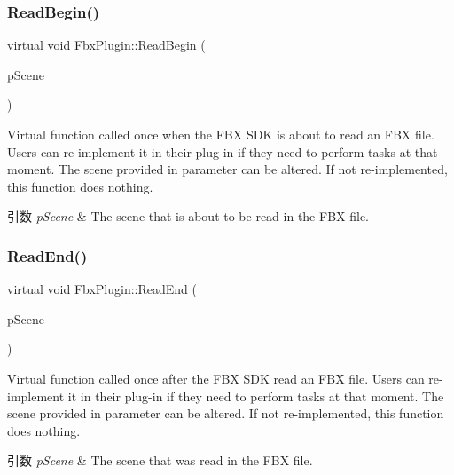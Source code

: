 \subsubsection{\texorpdfstring{Read\+Begin()}{ReadBegin()}}
{\footnotesize\ttfamily virtual void Fbx\+Plugin\+::\+Read\+Begin (\begin{DoxyParamCaption}\item[{\hyperlink{class_fbx_scene}{Fbx\+Scene} \&}]{p\+Scene }\end{DoxyParamCaption})\hspace{0.3cm}{\ttfamily [virtual]}}

Virtual function called once when the F\+BX S\+DK is about to read an F\+BX file. Users can re-\/implement it in their plug-\/in if they need to perform tasks at that moment. The scene provided in parameter can be altered. If not re-\/implemented, this function does nothing. 
\begin{DoxyParams}{引数}
{\em p\+Scene} & The scene that is about to be read in the F\+BX file. \\
\hline
\end{DoxyParams}
\mbox{\label{class_fbx_plugin_a89290eef23c5359db142e0ad1d8743e0}} 
\subsubsection{\texorpdfstring{Read\+End()}{ReadEnd()}}
{\footnotesize\ttfamily virtual void Fbx\+Plugin\+::\+Read\+End (\begin{DoxyParamCaption}\item[{\hyperlink{class_fbx_scene}{Fbx\+Scene} \&}]{p\+Scene }\end{DoxyParamCaption})\hspace{0.3cm}{\ttfamily [virtual]}}

Virtual function called once after the F\+BX S\+DK read an F\+BX file. Users can re-\/implement it in their plug-\/in if they need to perform tasks at that moment. The scene provided in parameter can be altered. If not re-\/implemented, this function does nothing. 
\begin{DoxyParams}{引数}
{\em p\+Scene} & The scene that was read in the F\+BX file. \\
\hline
\end{DoxyParams}
\mbox{\label{class_fbx_plugin_ab64d3a67a358e3b9466bc8f6d26e3be2}} 
